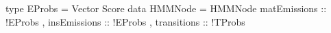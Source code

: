 type EProbs = Vector Score
data HMMNode = HMMNode { matEmissions :: !EProbs
                       , insEmissions :: !EProbs
                       , transitions  :: !TProbs
                       }
